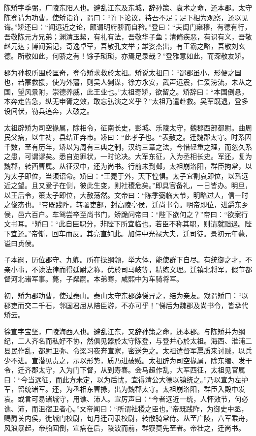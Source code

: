 \documentclass[12pt,UTF8]{ctexbook}
\begin{document}
陈矫字季弼，广陵东阳人也。避乱江东及东城，辞孙策、袁术之命，还本郡。太守陈登请为功曹，使矫诣许，谓曰：“许下论议，待吾不足；足下相为观察，还以见诲。”矫还曰：“闻远近之论，颇谓明府骄而自矜。”登曰：“夫闺门雍穆，有德有行，吾敬陈元方兄弟；渊清玉絜，有礼有法，吾敬华子鱼；清脩疾恶，有识有义，吾敬赵元达；博闻强记，奇逸卓荦，吾敬孔文举；雄姿杰出，有王霸之略，吾敬刘玄德。所敬如此，何骄之有！馀子琐琐，亦焉足录哉？”登雅意如此，而深敬友矫。

郡为孙权所围於匡奇，登令矫求救於太祖。矫说太祖曰：“鄙郡虽小，形便之国也，若蒙救援，使为外藩，则吴人剉谋，徐方永安，武声远震，仁爱滂流，未从之国，望风景附，崇德养威，此王业也。”太祖奇矫，欲留之。矫辞曰：“本国倒悬，本奔走告急，纵无申胥之效，敢忘弘演之义乎？”太祖乃遣赴救。吴军既退，登多设间伏，勒兵追奔，大破之。

太祖辟矫为司空掾属，除相令，征南长史，彭城、乐陵太守，魏郡西部都尉。曲周民父病，以牛祷，县结正弃市。矫曰：“此孝子也。“表赦之。迁魏郡太守。时系囚千数，至有历年，矫以为周有三典之制，汉约三章之法，今惜轻重之理，而忽久系之患，可谓谬矣。悉自览罪状，一时论决。大军东征，入为丞相长史。军还，复为魏郡，转西曹属。从征汉中，还为尚书。行前未到邺，太祖崩洛阳，群臣拘常，以为太子即位，当须诏命。矫曰：“王薨于外，天下惶惧。太子宜割哀即位，以系远近之望。且又爱子在侧，彼此生变，则社稷危矣。”即具官备礼，一日皆办。明旦，以王后令，策太子即位，大赦荡然。文帝曰：“陈季弼临大节，明略过人，信一时之俊杰也。“帝既践阼，转署吏部，封高陵亭侯，迁尚书令。明帝即位，进爵东乡侯，邑六百户。车驾尝卒至尚书门，矫跪问帝曰：“陛下欲何之？”帝曰：“欲案行文书耳。“矫曰：“此自臣职分，非陛下所宜临也。若臣不称其职，则请就黜退。陛下宜还。”帝惭，回车而反。其亮直如此。加侍中光禄大夫，迁司徒。景初元年薨，谥曰贞侯。

子本嗣，历位郡守、九卿。所在操纲领，举大体，能使群下自尽。有统御之才，不亲小事，不读法律而得廷尉之称，优於司马岐等，精练文理。迁镇北将军，假节都督河北诸军事。薨，子粲嗣。本弟骞，咸熙中为车骑将军。

初，矫为郡功曹，使过泰山。泰山太守东郡薛悌异之，结为亲友。戏谓矫曰：“以郡吏而交二千石，邻国君屈从陪臣游，不亦可乎！”悌后为魏郡及尚书令，皆承代矫云。

徐宣字宝坚，广陵海西人也。避乱江东，又辞孙策之命，还本郡。与陈矫并为纲纪，二人齐名而私好不协，然俱见器於太守陈登，与登并心於太祖。海西、淮浦二县民作乱，都尉卫弥、令梁习夜奔宣家，密送免之。太祖遣督军扈质来讨贼，以兵少不进。宣潜见责之，示以形势，质乃进破贼。太祖辟为司空掾属，除东缗、发干令，迁齐郡太守，入为门下督，从到寿春。会马超作乱，大军西征，太祖见官属曰：“今当远征，而此方未定，以为后忧，宜得清公大德以镇统之。”乃以宣为左护军，留统诸军。还，为丞相东曹掾，出为魏郡太守。太祖崩洛阳，群臣入殿中发哀。或言可易诸城守，用谯、沛人。宣厉声曰：“今者远近一统，人怀效节，何必谯、沛，而沮宿卫者心。”文帝闻曰：“所谓社稷之臣也。”帝既践阼，为御史中丞，赐爵关内侯，徙城门校尉，旬月迁司隶校尉，转散骑常侍。从至广陵，六军乘舟，风浪暴起，帝船回倒，宣病在后，陵波而前，群寮莫先至者。帝壮之，迁尚书。
\end{document}
